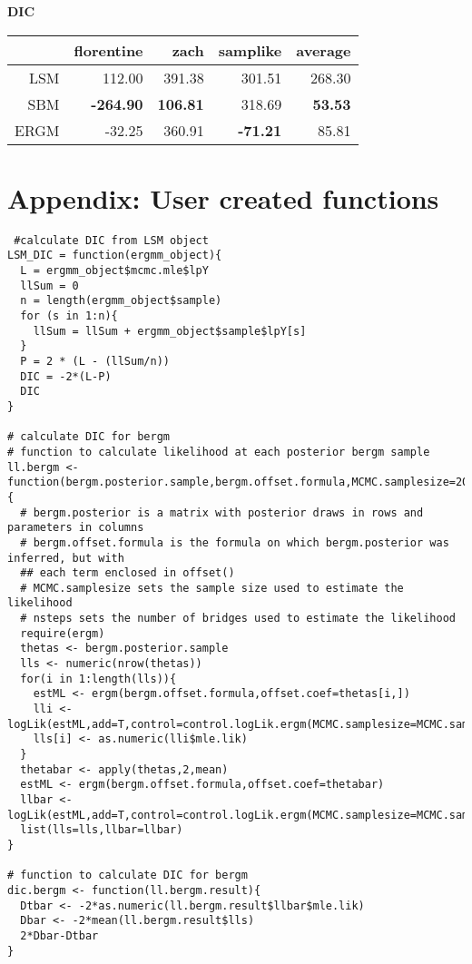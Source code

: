 \documentclass{article}
\begin{document}
\begin{table}[ht]
\centering

\textbf{DIC}

\vspace{3mm}

\begin{tabular}{rrrrr}
  \hline
 & florentine & zach & samplike & average\\ 
  \hline
LSM & 112.00 & 391.38 & 301.51 & 268.30 \\ 
  SBM & \textbf{-264.90} & \textbf{106.81} & 318.69 & \textbf{53.53}\\ 
  ERGM & -32.25 & 360.91 & \textbf{-71.21} & 85.81\\ 
   \hline
\end{tabular}
\end{table}


\newpage
\section*{Appendix: User created functions}
 \begin{verbatim}
 #calculate DIC from LSM object
LSM_DIC = function(ergmm_object){
  L = ergmm_object$mcmc.mle$lpY
  llSum = 0
  n = length(ergmm_object$sample)
  for (s in 1:n){
    llSum = llSum + ergmm_object$sample$lpY[s]
  }
  P = 2 * (L - (llSum/n))
  DIC = -2*(L-P)
  DIC
}

# calculate DIC for bergm
# function to calculate likelihood at each posterior bergm sample
ll.bergm <- function(bergm.posterior.sample,bergm.offset.formula,MCMC.samplesize=2000,nsteps=50){
  # bergm.posterior is a matrix with posterior draws in rows and parameters in columns
  # bergm.offset.formula is the formula on which bergm.posterior was inferred, but with
  ## each term enclosed in offset()
  # MCMC.samplesize sets the sample size used to estimate the likelihood
  # nsteps sets the number of bridges used to estimate the likelihood
  require(ergm)
  thetas <- bergm.posterior.sample
  lls <- numeric(nrow(thetas))
  for(i in 1:length(lls)){
    estML <- ergm(bergm.offset.formula,offset.coef=thetas[i,])
    lli <- logLik(estML,add=T,control=control.logLik.ergm(MCMC.samplesize=MCMC.samplesize,nsteps=nsteps))
    lls[i] <- as.numeric(lli$mle.lik)
  }
  thetabar <- apply(thetas,2,mean)
  estML <- ergm(bergm.offset.formula,offset.coef=thetabar)
  llbar <- logLik(estML,add=T,control=control.logLik.ergm(MCMC.samplesize=MCMC.samplesize,nsteps=nsteps))
  list(lls=lls,llbar=llbar)
}

# function to calculate DIC for bergm
dic.bergm <- function(ll.bergm.result){
  Dtbar <- -2*as.numeric(ll.bergm.result$llbar$mle.lik)
  Dbar <- -2*mean(ll.bergm.result$lls)
  2*Dbar-Dtbar
}
   \end{verbatim}
\end{document}
